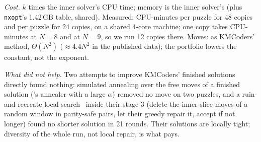 \emph{Cost.} $k$ times the inner solver's CPU time; memory is the inner solver's (plus \texttt{nxopt}'s 1.42\,GB table, shared).
Measured: \MsevenCpuMinFour{} CPU-minutes per  puzzle for 48 copies and \MsevenCpuMinFive{} per  puzzle for 24
copies, on a shared 4-core machine; one copy takes \ScaleCpuEight{} CPU-minutes at $N=8$ and \ScaleCpuNine{} at $N=9$, so
we run 12 copies there. Moves: as KMCoders' method, $\Theta(N^2)$ ($\approx4.4N^2$ in the published data); the
portfolio lowers the constant, not the exponent.

\emph{What did not help.} Two attempts to improve KMCoders' finished solutions directly found nothing: simulated annealing
over the free moves of a finished solution (\Msix's annealer with a large $\alpha$) removed no move on two  puzzles, and a
ruin-and-recreate local search~\cite{shaw1998lns} inside their stage 3 (delete the inner-slice moves of a random window in
parity-safe pairs, let their greedy repair it, accept if not longer) found no shorter solution in 21 rounds. Their solutions are
locally tight; diversity of the whole run, not local repair, is what pays.
